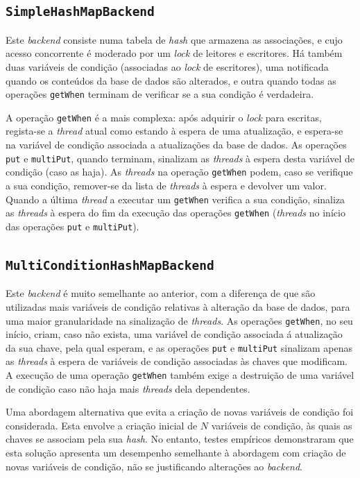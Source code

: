 \documentclass[11pt, a4paper]{article}
\begin{document}
\subsection{\texttt{SimpleHashMapBackend}}

Este \emph{backend} consiste numa tabela de \emph{hash} que armazena as associações, e cujo acesso
concorrente é moderado por um \emph{lock} de leitores e escritores. Há também duas variáveis de
condição (associadas ao \emph{lock} de escritores), uma notificada quando os conteúdos da base de
dados são alterados, e outra quando todas as operações \texttt{getWhen} terminam de verificar se a
sua condição é verdadeira.

A operação \texttt{getWhen} é a mais complexa: após adquirir o \emph{lock} para escritas, regista-se
a \emph{thread} atual como estando à espera de uma atualização, e espera-se na variável de condição
associada a atualizações da base de dados. As operações \texttt{put} e \texttt{multiPut}, quando
terminam, sinalizam as \emph{threads} à espera desta variável de condição (caso as haja). As
\emph{threads} na operação \texttt{getWhen} podem, caso se verifique a sua condição, remover-se da
lista de \emph{threads} à espera e devolver um valor. Quando a última \emph{thread} a executar um
\texttt{getWhen} verifica a sua condição, sinaliza as \emph{threads} à espera do fim da execução das
operações \texttt{getWhen} (\emph{threads} no início das operações \texttt{put} e \texttt{multiPut}).

\subsection{\texttt{MultiConditionHashMapBackend}}

Este \emph{backend} é muito semelhante ao anterior, com a diferença de que são utilizadas mais
variáveis de condição relativas à alteração da base de dados, para uma maior granularidade na
sinalização de \emph{threads}. As operações \texttt{getWhen}, no seu início, criam, caso não exista,
uma variável de condição associada á atualização da sua chave, pela qual esperam, e as operações
\texttt{put} e \texttt{multiPut} sinalizam apenas as \emph{threads} à espera de variáveis de
condição associadas às chaves que modificam. A execução de uma operação \texttt{getWhen} também
exige a destruição de uma variável de condição caso não haja mais \emph{threads} dela dependentes.

Uma abordagem alternativa que evita a criação de novas variáveis de condição foi considerada. Esta
envolve a criação inicial de $N$ variáveis de condição, às quais as chaves se associam pela sua
\emph{hash}. No entanto, testes empíricos demonstraram que esta solução apresenta um desempenho
semelhante à abordagem com criação de novas variáveis de condição, não se justificando alterações ao
\emph{backend}.
\end{document}
